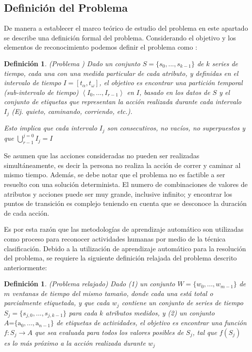 \subsection{Definición del Problema}

\label{sec261:definicion-har}De manera a establecer el marco teórico
de estudio del problema  en este apartado se describe una
definición formal del problema. Considerando el objetivo y los elementos
de reconocimiento podemos definir el problema como \cite{LaraLabrador2013}:

\label{def2:harp}\newtheorem{defs}{Definición}

\begin{defs}(Problema ) Dado un conjunto $S=\{s_{0},...,s_{k-1}\}$
de $k$ series de tiempo, cada una con una medida particular de cada
atributo, y definidas en el intervalo de tiempo $I=\left[t_{\alpha},t_{\omega}\right]$,
el objetivo es encontrar una partición temporal (\emph{sub}-intervalo
de tiempo) $\left\langle I_{0},...,I_{r-1}\right\rangle $ en $I$,
basado en los datos de $S$ y el conjunto de etiquetas que representan
la acción realizada durante cada intervalo $I_{j}$ (Ej. quieto, caminando,
corriendo, etc.). 

Esto implica que cada intervalo $I_{j}$ son consecutivos, no vacíos,
no superpuestos y que ${\displaystyle \bigcup_{r-1}^{j=0}{I_{j}=I}}$
\end{defs}

Se asumen que las acciones consideradas no pueden ser realizadas simultáneamente,
es decir la persona no realiza la acción de correr y caminar al mismo
tiempo. Además, se debe notar que el problema  no es factible
a ser resuelto con una solución determinista. El numero de combinaciones
de valores de atributos y acciones puede ser muy grande, inclusive
infinito; y encontrar los puntos de transición es complejo teniendo
en cuenta que se desconoce la duración de cada acción. 

Es por esta razón que las metodologías de aprendizaje automático son
utilizadas como proceso para reconocer actividades humanas por medio
de la técnica clasificación. Debido a la utilización de aprendizaje
automático para la resolución del problema, se requiere la siguiente
definición relajada del problema  descrito anteriormente: 

\label{def2:harp-rel}\newtheorem{defs}{Definición}

\begin{defs}(Problema  relajado) Dado (1) un conjunto
$W=\{w_{0},...,w_{m-1}\}$ de $m$ ventanas de tiempo del mismo tamaño,
donde cada una está total o parcialmente etiquetada, y que cada $w_{j}$
contiene un conjunto de series de tiempo $S_{j}=\{s_{j,0},...,s_{j,k-1}\}$
para cada $k$ atributos medidos, y (2) un conjunto $A\text{=}\{\mathrm{a}_{0},...,\mathrm{a}_{n-1}\}$
de etiquetas de actividades, el objetivo es encontrar una función
$f\colon S_{j}\rightarrow A$ que sea evaluada para todos los valores
posibles de $S_{j}$, tal que $f(S_{j})$ es lo más próximo a la acción
realizada durante $w_{j}$ \end{defs}

